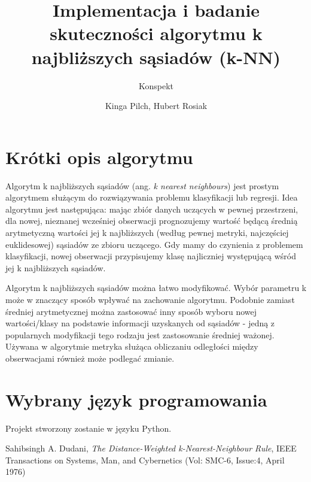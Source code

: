 \documentclass{scrartcl}
\begin{document}
\title{Implementacja i badanie skuteczności algorytmu k najbliższych sąsiadów (k-NN)}

\subtitle{Konspekt}

\author{Kinga Pilch, Hubert Rosiak}

\maketitle

\section*{Krótki opis algorytmu}

Algorytm k najbliższych sąsiadów (ang. \textit{k nearest neighbours}) jest prostym algorytmem służącym do rozwiązywania problemu klasyfikacji lub regresji. Idea algorytmu jest następująca: mając zbiór danych uczących w pewnej przestrzeni, dla nowej, nieznanej wcześniej obserwacji prognozujemy wartość będącą średnią arytmetyczną wartości jej k najbliższych (według pewnej metryki, najczęściej euklidesowej) sąsiadów ze zbioru uczącego. Gdy mamy do czynienia z problemem klasyfikacji, nowej obserwacji przypisujemy klasę najliczniej występującą wśród jej k najbliższych sąsiadów.

Algorytm k najbliższych sąsiadów można łatwo modyfikować. Wybór parametru k może w znaczący sposób wpływać na zachowanie algorytmu. Podobnie zamiast średniej arytmetycznej można zastosować inny sposób wyboru nowej wartości/klasy na podstawie informacji uzyskanych od sąsiadów - jedną z popularnych modyfikacji tego rodzaju jest zastosowanie średniej ważonej. Używana w algorytmie metryka służąca obliczaniu odległości między obserwacjami również może podlegać zmianie.

\section*{Wybrany język programowania}

Projekt stworzony zostanie w języku Python.

\begin{thebibliography}{1}
Sahibsingh A. Dudani, 
\textit{The Distance-Weighted k-Nearest-Neighbour Rule},
IEEE Transactions on Systems, Man, and Cybernetics (Vol: SMC-6, Issue:4, April 1976)
\end{thebibliography}
\end{document}
